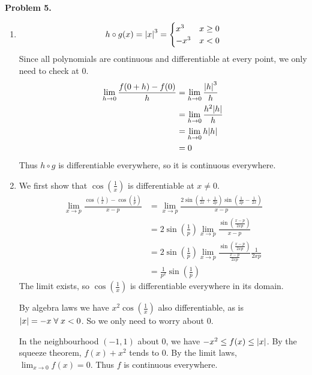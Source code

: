 \documentclass[12pt]{article}
\begin{document}
\textbf{Problem 5.}
\begin{enumerate}[label=(\alph*)]
    \item \[
        h \circ g (x) = \abs{ x }^{3} =
        \begin{cases}
            x^{3} & x \geq 0 \\
            -x^{3} & x < 0
        \end{cases}
    \] Since all polynomials are continuous and differentiable at every point, we only need to check at 0.
    \begin{align*}
        \lim_{h \to 0} \frac{f(0 + h) - f(0)}{h} &= \lim_{h \to 0} \frac{\abs{ h }^{3}}{h} \\
        &= \lim_{h \to 0} \frac{h^{2}\abs{ h }}{h} \\
        &= \lim_{h \to 0} h \abs{ h } \\
        &= 0
    \end{align*}
    Thus $h \circ g$ is differentiable everywhere, so it is continuous everywhere.

    \item We first show that $\cos(\frac{1}{x})$ is differentiable at $x \neq 0$.
    \begin{align*}
        \lim_{x \to p} \frac{\cos(\frac{1}{x}) - \cos(\frac{1}{p})}{x - p} &= \lim_{x \to p} \frac{2 \sin(\frac{1}{2x} + \frac{1}{2p})\sin(\frac{1}{2p} - \frac{1}{2x})}{x - p} \\
        &= 2 \sin(\frac{1}{p}) \lim_{x \to p} \frac{\sin(\frac{x - p}{2xp})}{x - p} \\
        &= 2 \sin(\frac{1}{p}) \lim_{x \to p} \frac{\sin(\frac{x - p}{2xp})}{\frac{x - p}{2xp}} \frac{1}{2xp} \\
        &= \frac{1}{p^{2}} \sin(\frac{1}{p})
    \end{align*}
    The limit exists, so $\cos(\frac{1}{x})$ is differentiable everywhere in its domain.

    By algebra laws we have $x^{2} \cos(\frac{1}{x})$ also differentiable, as is $\abs{ x } = -x \;\forall\; x < 0$. So we only need to worry about 0.

    In the neighbourhood $(-1, 1)$ about 0, we have $-x^{2} \leq f(x) \leq \abs{ x }$. By the squeeze theorem, $f(x) + x^{2}$ tends to 0. By the limit laws, $\lim_{x \to 0} f(x) = 0$. Thus $f$ is continuous everywhere.


\end{enumerate}
\end{document}
